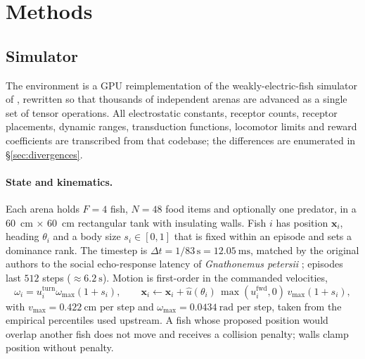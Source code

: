 \section{Methods}
\label{app:methods}

\subsection{Simulator}

The environment is a GPU reimplementation of the weakly-electric-fish simulator
of \citet{singh2025active}, rewritten so that thousands of independent arenas are
advanced as a single set of tensor operations. All electrostatic constants,
receptor counts, receptor placements, dynamic ranges, transduction functions,
locomotor limits and reward coefficients are transcribed from that codebase; the
differences are enumerated in \S\ref{sec:divergences}.

\paragraph{State and kinematics.}
Each arena holds $F=4$ fish, $N=48$ food items and optionally one predator, in a
\SI{60}{\centi\metre} $\times$ \SI{60}{\centi\metre} rectangular tank with
insulating walls. Fish $i$ has position $\mathbf{x}_i$, heading $\theta_i$ and a
body size $s_i\in[0,1]$ that is fixed within an episode and sets a dominance
rank. The timestep is $\Delta t = 1/83\,\mathrm{s} = \SI{12.05}{\milli\second}$,
matched by the original authors to the social echo-response latency of
\emph{Gnathonemus petersii} \citep{schuster2001count}; episodes last $512$ steps
($\approx\SI{6.2}{\second}$). Motion is first-order in the commanded velocities,
\begin{equation}
\omega_i = u^{\text{turn}}_i \omega_{\max}(1+s_i),\qquad
\mathbf{x}_i \leftarrow \mathbf{x}_i + \hat{u}(\theta_i)\,
  \max(u^{\text{fwd}}_i,0)\, v_{\max}(1+s_i),
\end{equation}
with $v_{\max}=\SI{0.422}{\centi\metre}$ per step and
$\omega_{\max}=\SI{0.0434}{\radian}$ per step, taken from the empirical
percentiles used upstream. A fish whose proposed position would overlap another
fish does not move and receives a collision penalty; walls clamp position without
penalty.


